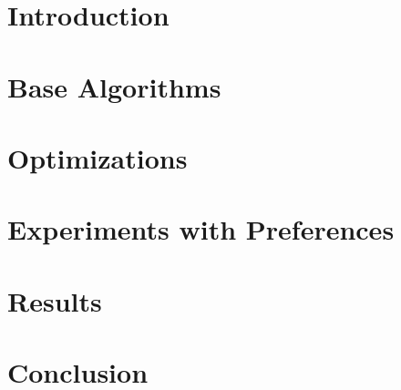 \chapter{Introduction}




\chapter{Base Algorithms}





\chapter{Optimizations}




\chapter{Experiments with Preferences}


\chapter{Results}
\label{chap:results}




\chapter{Conclusion}
